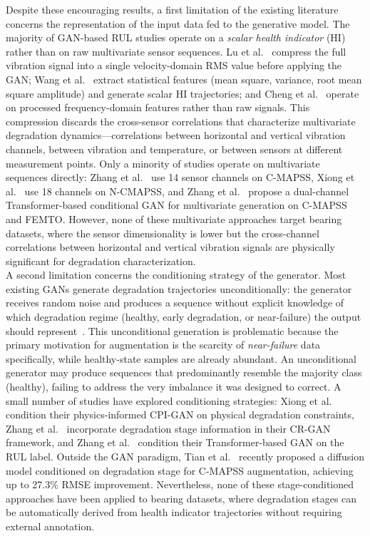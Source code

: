 Despite these encouraging results, a first limitation of the existing
literature concerns the representation of the input data fed to the
generative model. The majority of GAN-based RUL studies operate on a
\textit{scalar health indicator} (HI) rather than on raw multivariate
sensor sequences. Lu et al.~\cite{9486650, lu_joint_2022} compress
the full vibration signal into a single velocity-domain RMS value
before applying the GAN; Wang et al.~\cite{vibration7020029} extract
statistical features (mean square, variance, root mean square
amplitude) and generate scalar HI trajectories; and
Cheng et al.~\cite{cheng_remaining_2023} operate on processed
frequency-domain features rather than raw signals. This compression
discards the cross-sensor correlations that characterize multivariate
degradation dynamics---correlations between horizontal and vertical
vibration channels, between vibration and temperature, or between
sensors at different measurement points. Only a minority of studies
operate on multivariate sequences directly: Zhang et al.~\cite{9300234}
use 14 sensor channels on C-MAPSS, Xiong et al.~\cite{xiong_controlled_2023}
use 18 channels on N-CMAPSS, and
Zhang et al.~\cite{zhang_multivariate_2025} propose a dual-channel
Transformer-based conditional GAN for multivariate generation on
C-MAPSS and FEMTO. However, none of these multivariate approaches
target bearing datasets, where the sensor dimensionality is lower but
the cross-channel correlations between horizontal and vertical
vibration signals are physically significant for degradation
characterization.\\

A second limitation concerns the conditioning strategy of the
generator. Most existing GANs generate degradation trajectories
unconditionally: the generator receives random noise and produces a
sequence without explicit knowledge of which degradation regime
(healthy, early degradation, or near-failure) the output should
represent~\cite{9486650, lu_joint_2022, vibration7020029,
wen_gru-ae-wiener_2024}. This unconditional generation is
problematic because the primary motivation for augmentation is the
scarcity of \textit{near-failure} data specifically, while healthy-state
samples are already abundant. An unconditional generator may produce
sequences that predominantly resemble the majority class (healthy),
failing to address the very imbalance it was designed to correct.
A small number of studies have explored conditioning strategies:
Xiong et al.~\cite{xiong_controlled_2023} condition their
physics-informed CPI-GAN on physical degradation constraints,
Zhang et al.~\cite{9300234} incorporate degradation stage information
in their CR-GAN framework, and
Zhang et al.~\cite{zhang_multivariate_2025} condition their
Transformer-based GAN on the RUL label. Outside the GAN paradigm,
Tian et al.~\cite{11503642} recently proposed a diffusion model
conditioned on degradation stage for C-MAPSS augmentation, achieving
up to 27.3\% RMSE improvement. Nevertheless, none of these
stage-conditioned approaches have been applied to bearing datasets,
where degradation stages can be automatically derived from health
indicator trajectories without requiring external annotation.\\

